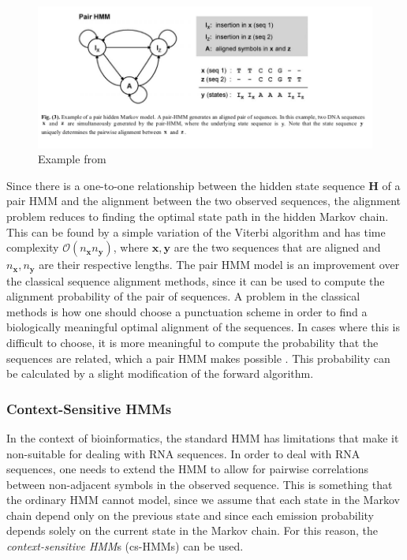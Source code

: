 \documentclass{article}
\begin{document}
\begin{figure}
    \centering
    \includegraphics[width = \textwidth]{examplePairHMMYoon.png}
    \caption{Example from \cite{Yoon2009}}
    \label{fig:Yoon2009PairHMMExample}
\end{figure}

Since there is a one-to-one relationship between the hidden state sequence $\mathbf{H}$ of a pair HMM and the alignment between the two observed sequences, the alignment problem reduces to finding the optimal state path in the hidden Markov chain. This can be found by a simple variation of the Viterbi algorithm and has time complexity $\mathcal{O}(n_\mathbf{x}n_\mathbf{y})$, where $\mathbf{x}, \mathbf{y}$ are the two sequences that are aligned and $n_\mathbf{x}, n_\mathbf{y}$ are their respective lengths. The pair HMM model is an improvement over the classical sequence alignment methods, since it can be used to compute the alignment probability of the pair of sequences. A problem in the classical methods is how one should choose a punctuation scheme in order to find a biologically meaningful optimal alignment of the sequences. In cases where this is difficult to choose, it is more meaningful to compute the probability that the sequences are related, which a pair HMM makes possible \cite{Yoon2009}. This probability can be calculated by a slight modification of the forward algorithm. 

\subsubsection{Context-Sensitive HMMs}
In the context of bioinformatics, the standard HMM has limitations that make it non-suitable for dealing with RNA sequences. In order to deal with RNA sequences, one needs to extend the HMM to allow for pairwise correlations between non-adjacent symbols in the observed sequence. This is something that the ordinary HMM cannot model, since we assume that each state in the Markov chain depend only on the previous state and since each emission probability depends solely on the current state in the Markov chain. For this reason, the \textit{context-sensitive HMM}s (cs-HMMs) can be used.
\end{document}
